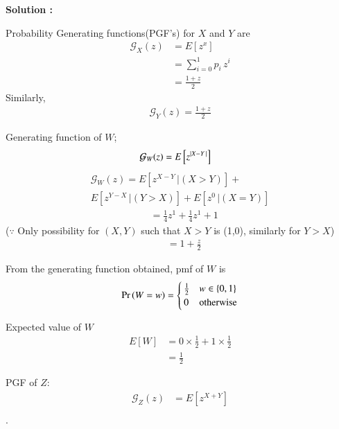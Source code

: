 \documentclass[journal,12pt,twocolumn]{IEEEtran}
\newenvironment{Proof}[2] {\textbf{Solution : }}{\hfill$\cdot$}
\begin{document}
\begin{Proof}{}{}
\begin{lemma}
Probability Generating functions(PGF's) for $X$ and $Y$ are
\begin{align}
    \mathcal{G}_{X}(z) &= E[z^x]\\
                       &= \sum_{i=0}^{1}p_i\,z^i\\
                       &=\frac{1+z}{2}
\end{align}
Similarly,
\begin{align}
    \mathcal{G}_{Y}(z) = \frac{1+z}{2}
\end{align}
\end{lemma}
\begin{lemma}
Generating function of $W$;
\begin{align}
    \mathcal{G}_W(z) &= E\left[z^{\vert X-Y\,\vert}\right]
\end{align}
\begin{multline}
  \mathcal{G}_W(z) = E\left[z^{X-Y}\,|(X>Y)\right] +\\ E\left[z^{Y-X}\,|(Y>X)\right] + E\left[z^0\,|(X=Y)\right]
\end{multline}
\begin{align}
    &= \frac{1}{4}z^1 + \frac{1}{4}z^1+1
\end{align}
($\because$ Only possibility for $(X,Y)$ such that $X>Y$ is (1,0), similarly for $Y>X$)
\begin{align}
  &= 1+\frac{z}{2}
\end{align}
\end{lemma} 
\begin{lemma}
From the generating function obtained, pmf of $W$ is
\begin{equation}
   \Pr\left(W=w\right) =
    \begin{cases}
      \frac{1}{2} & w \in \left\{0,1\right\}\\
      0 & \text{otherwise}
    \end{cases}       
\end{equation}
\end{lemma}
\begin{lemma}
Expected value of $W$
\begin{align}
   E[W] &= 0\times\frac{1}{2} + 1\times\frac{1}{2}\\
                    &= \frac{1}{2} 
\end{align}
\end{lemma}
\begin{lemma}
PGF of $Z$:
\begin{align}
  \mathcal{G}_Z(z) &= E[z^{X+Y}]\\

\end{align}
\end{lemma}
\end{Proof}
\end{document}
